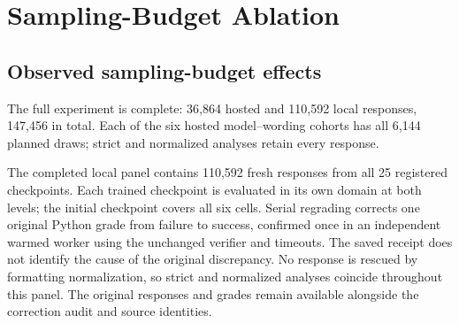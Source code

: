\documentclass{article}
\newcommand{\1}{\mathbf 1}
\theoremstyle{remark}
\theoremstyle{definition}
\theoremstyle{plain}
\begin{document}
\clearpage
\section{Sampling-Budget Ablation}
\label{app:sampling-budget-ablation}







\subsection{Observed sampling-budget effects}
\label{app:sampling-budget-effects}

The full experiment is complete: 36,864 hosted and 110,592 local responses,
147,456 in total. Each of the six hosted model--wording cohorts has all
6,144 planned draws; strict and normalized analyses retain every response.

The completed local panel contains 110,592 fresh responses from all 25
registered checkpoints. Each trained checkpoint is evaluated in its own domain
at both levels; the initial checkpoint covers all six cells. Serial regrading
corrects one original Python grade from failure to success, confirmed once
in an independent warmed worker using the unchanged verifier and timeouts.
The saved receipt does not identify the cause of the original discrepancy.
No response is rescued by formatting normalization, so strict and normalized
analyses coincide throughout this panel. The original responses and grades
remain available alongside the correction audit and source identities.
\end{document}
